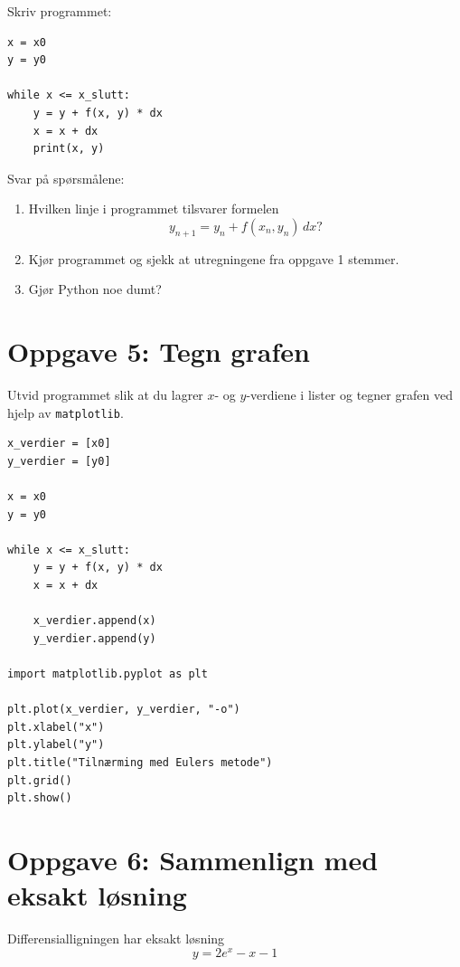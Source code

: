 \documentclass[a4paper,12pt]{article}
\begin{document}
Skriv programmet:

\begin{lstlisting}
x = x0
y = y0

while x <= x_slutt:
    y = y + f(x, y) * dx
    x = x + dx
    print(x, y)
\end{lstlisting}

Svar på spørsmålene:

\begin{enumerate}[label=\alph*)]
\item Hvilken linje i programmet tilsvarer formelen 
\[
y_{n+1} = y_n + f(x_n,y_n)\, dx?
\]
\item Kjør programmet og sjekk at utregningene fra oppgave 1 stemmer.
\item Gjør Python noe dumt?
\end{enumerate}

\section*{Oppgave 5: Tegn grafen}

Utvid programmet slik at du lagrer $x$- og $y$-verdiene i lister og tegner grafen ved hjelp av \lstinline|matplotlib|.

\begin{lstlisting}
x_verdier = [x0]
y_verdier = [y0]

x = x0
y = y0

while x <= x_slutt:
    y = y + f(x, y) * dx
    x = x + dx
	
    x_verdier.append(x)
    y_verdier.append(y)

import matplotlib.pyplot as plt

plt.plot(x_verdier, y_verdier, "-o")
plt.xlabel("x")
plt.ylabel("y")
plt.title("Tilnærming med Eulers metode")
plt.grid()
plt.show()
\end{lstlisting}

\section*{Oppgave 6: Sammenlign med eksakt løsning}

Differensialligningen har eksakt løsning
\begin{equation}
y = 2e^{x} - x - 1
\label{eq:yexact}
\end{equation}
\end{document}
